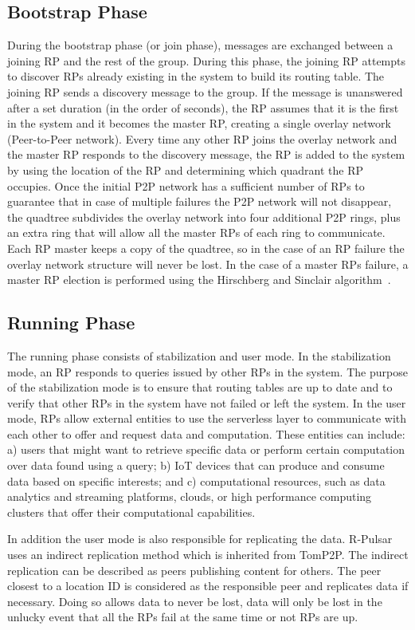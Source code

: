 \subsection{Bootstrap Phase}
During the bootstrap phase (or join phase), messages are exchanged between a joining RP and the rest of the group. During this phase, the joining RP attempts to discover RPs already existing in the system to build its routing table. The joining RP sends a discovery message to the group. If the message is unanswered after a set duration (in the order of seconds), the RP assumes that it is the first in the system and it becomes the master RP, creating a single overlay network (Peer-to-Peer network). Every time any other RP joins the overlay network and the master RP responds to the discovery message, the  RP is added to the system by using the location of the RP and determining which quadrant the RP occupies. Once the initial P2P network has a sufficient number of RPs to guarantee that in case of multiple failures the P2P network will not disappear, the quadtree subdivides the overlay network into four additional P2P rings, plus an extra ring that will allow all the master RPs of each ring to communicate. Each RP master keeps a copy of the quadtree, so in the case of an RP failure the overlay network structure will never be lost. In the case of a master RPs failure, a master RP election is performed using the Hirschberg and Sinclair algorithm~\cite{Hirschberg}.

\subsection{Running Phase}
The running phase consists of stabilization and user mode. In the stabilization mode, an RP responds to queries issued by other RPs in the system. The purpose of the stabilization mode is to ensure that routing tables are up to date and to verify that other RPs in the system have not failed or left the system. In the user mode, RPs allow external entities to use the serverless layer to communicate with each other to offer and request data and computation. These entities can include: a) users that might want to retrieve specific data or perform certain computation over data found using a query; b) IoT devices that can produce and consume data based on specific interests; and c) computational resources, such as data analytics and streaming platforms, clouds, or high performance computing clusters that offer their computational capabilities.

In addition the user mode is also responsible for replicating the data. R-Pulsar uses an indirect replication method which is inherited from TomP2P. The indirect replication can be described as peers publishing content for others. The peer closest to a location ID is considered as the responsible peer and replicates data if necessary. Doing so allows data to never be lost, data will only be lost in the unlucky event that all the RPs fail at the same time or not RPs are up.

